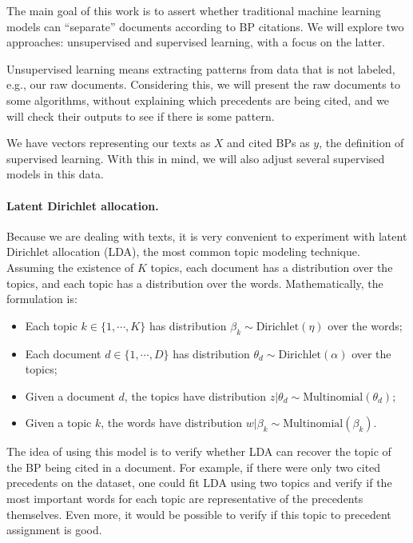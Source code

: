 \documentclass[twocolumn]{article}
\begin{document}
                  The main goal of this work is to assert whether traditional machine learning models can ``separate'' documents according to BP citations. We will explore two approaches: unsupervised and supervised learning, with a focus on the latter.

                  Unsupervised learning means extracting patterns from data that is not labeled, e.g., our raw documents. Considering this, we will present the raw documents to some algorithms, without explaining which precedents are being cited, and we will check their outputs to see if there is some pattern.
                  
                  We have vectors representing our texts as $X$ and cited BPs as $y$, the definition of supervised learning. With this in mind, we will also adjust several supervised models in this data.

                  \paragraph{Latent Dirichlet allocation.} Because we are dealing with texts, it is very convenient to experiment with latent Dirichlet allocation (LDA), the most common topic modeling technique. Assuming the existence of $K$ topics, each document has a distribution over the topics, and each topic has a distribution over the words. Mathematically, the formulation is:

                  \begin{itemize}
                        \item Each topic $k \in \{1, \cdots, K\}$ has distribution $\beta_k \sim \text{Dirichlet}(\eta)$ over the words;
                        \item Each document $d \in \{1, \cdots, D\}$ has distribution $\theta_d \sim \text{Dirichlet}(\alpha)$ over the topics;
                        \item Given a document $d$, the topics have distribution $z | \theta_d \sim \text{Multinomial}(\theta_d)$;
                        \item Given a topic $k$, the words have distribution $w | \beta_k \sim \text{Multinomial}(\beta_k)$.
                  \end{itemize}
                  
                  The idea of using this model is to verify whether LDA can recover the topic of the BP being cited in a document. For example, if there were only two cited precedents on the dataset, one could fit LDA using two topics and verify if the most important words for each topic are representative of the precedents themselves. Even more, it would be possible to verify if this topic to precedent assignment is good.
\end{document}
